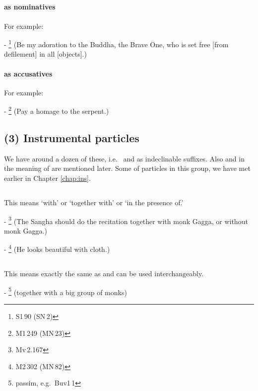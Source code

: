 \subsection*{}\label{nip:namo}
\paragraph*{ as nominatives} For example:\par
- \footnote{S1\,90 (SN\,2)} (Be my adoration to the Buddha, the Brave One, who is set free [from defilement] in all [objects].) \par
\paragraph*{ as accusatives} For example:\par
- \footnote{M1\,249 (MN\,23)} (Pay a homage to the serpent.) \par

\subsection*{(3) Instrumental particles}

We have around a dozen of these, i.e.\  and  as indeclinable suffixes. Also  and  in the meaning of  are mentioned later. Some of particles in this group, we have met earlier in Chapter \ref{chap:ins}.

\subsection*{}\label{nip:saha}
This means `with' or `together with' or `in the presence of.'\par
- \footnote{Mv\,2.167} (The Sangha should do the recitation together with monk Gagga, or without monk Gagga.) \par
- \footnote{M2\,302 (MN\,82)} (He looks beautiful with cloth.) \par

\subsection*{}\label{nip:saddhidm}
This means exactly the same as  and can be used interchangeably.\par 
- \footnote{passim, e.g.\ Buv1\,1} (together with a big group of monks) \par

